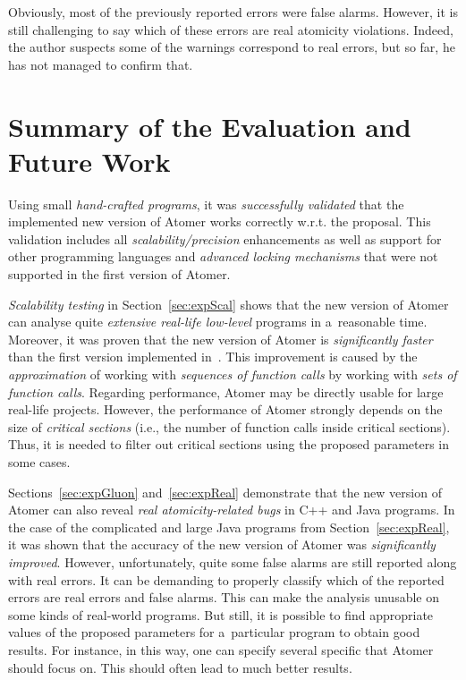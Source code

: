 Obviously, most of the previously reported errors were false alarms. However, it is still challenging to say which of these errors are real atomicity violations. Indeed, the author suspects some of the warnings correspond to real errors, but so far, he has not managed to confirm that.


\section{Summary of the Evaluation and Future Work}
\label{sec:expSummary}

Using small \emph{hand-crafted programs}, it was \emph{successfully validated} that the implemented new version of Atomer works correctly w.r.t. the proposal. This validation includes all \emph{scalability/precision} enhancements as well as support for other programming languages and \emph{advanced locking mechanisms} that were not supported in the first version of Atomer.

\emph{Scalability testing} in Section~\ref{sec:expScal} shows that the new version of Atomer can analyse quite \emph{extensive real-life low-level} programs in a~reasonable time. Moreover, it was proven that the new version of Atomer is \emph{significantly faster} than the first version implemented in~\cite{harmimBP}. This improvement is caused by the \emph{approximation} of working with \emph{sequences of function calls} by working with \emph{sets of function calls}. Regarding performance, Atomer may be directly usable for large real-life projects. However, the performance of Atomer strongly depends on the size of \emph{critical sections} (i.e., the number of function calls inside critical sections). Thus, it is needed to filter out  critical sections using the proposed parameters in some cases.

Sections~\ref{sec:expGluon} and~\ref{sec:expReal} demonstrate that the new version of Atomer can also reveal \emph{real atomicity-related bugs} in C++ and Java programs. In the case of the complicated and large Java programs from Section~\ref{sec:expReal}, it was shown that the accuracy of the new version of Atomer was \emph{significantly improved}. However, unfortunately, quite some false alarms are still reported along with real errors. It can be demanding to properly classify which of the reported errors are real errors and false alarms. This can make the analysis unusable on some kinds of real-world programs. But still, it is possible to find appropriate values of the proposed parameters for a~particular program to obtain good results. For instance, in this way, one can specify several specific  that Atomer should focus on. This should often lead to much better results.

